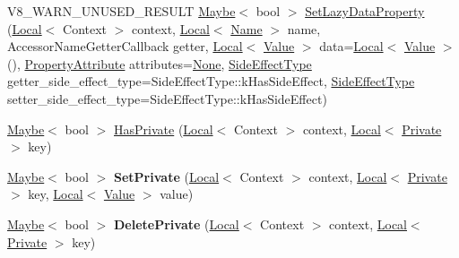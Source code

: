 \begin{DoxyCompactItemize}
V8\+\_\+\+W\+A\+R\+N\+\_\+\+U\+N\+U\+S\+E\+D\+\_\+\+R\+E\+S\+U\+LT \mbox{\hyperlink{classv8_1_1Maybe}{Maybe}}$<$ bool $>$ \mbox{\hyperlink{classv8_1_1Object_a6319997d34104e74b3ce6959affa7095}{Set\+Lazy\+Data\+Property}} (\mbox{\hyperlink{classv8_1_1Local}{Local}}$<$ Context $>$ context, \mbox{\hyperlink{classv8_1_1Local}{Local}}$<$ \mbox{\hyperlink{classv8_1_1Name}{Name}} $>$ name, Accessor\+Name\+Getter\+Callback getter, \mbox{\hyperlink{classv8_1_1Local}{Local}}$<$ \mbox{\hyperlink{classv8_1_1Value}{Value}} $>$ data=\mbox{\hyperlink{classv8_1_1Local}{Local}}$<$ \mbox{\hyperlink{classv8_1_1Value}{Value}} $>$(), \mbox{\hyperlink{namespacev8_a05f25f935e108a1ea2d150e274602b87}{Property\+Attribute}} attributes=\mbox{\hyperlink{namespacev8_a05f25f935e108a1ea2d150e274602b87a7ab4d58719c33b3ea2dfaefa29b111df}{None}}, \mbox{\hyperlink{namespacev8_a29711319c2b9fc7716d65faee2f7b9cb}{Side\+Effect\+Type}} getter\+\_\+side\+\_\+effect\+\_\+type=Side\+Effect\+Type\+::k\+Has\+Side\+Effect, \mbox{\hyperlink{namespacev8_a29711319c2b9fc7716d65faee2f7b9cb}{Side\+Effect\+Type}} setter\+\_\+side\+\_\+effect\+\_\+type=Side\+Effect\+Type\+::k\+Has\+Side\+Effect)
\item 
\mbox{\hyperlink{classv8_1_1Maybe}{Maybe}}$<$ bool $>$ \mbox{\hyperlink{classv8_1_1Object_aad699867935fd2142ec97afa6e39a7f0}{Has\+Private}} (\mbox{\hyperlink{classv8_1_1Local}{Local}}$<$ Context $>$ context, \mbox{\hyperlink{classv8_1_1Local}{Local}}$<$ \mbox{\hyperlink{classv8_1_1Private}{Private}} $>$ key)
\item 
\mbox{\label{classv8_1_1Object_a6ebc49302a65e706c52eeca31ba83283}} 
\mbox{\hyperlink{classv8_1_1Maybe}{Maybe}}$<$ bool $>$ {\bfseries Set\+Private} (\mbox{\hyperlink{classv8_1_1Local}{Local}}$<$ Context $>$ context, \mbox{\hyperlink{classv8_1_1Local}{Local}}$<$ \mbox{\hyperlink{classv8_1_1Private}{Private}} $>$ key, \mbox{\hyperlink{classv8_1_1Local}{Local}}$<$ \mbox{\hyperlink{classv8_1_1Value}{Value}} $>$ value)
\item 
\mbox{\label{classv8_1_1Object_ad78ba140348f92581361329aab917382}} 
\mbox{\hyperlink{classv8_1_1Maybe}{Maybe}}$<$ bool $>$ {\bfseries Delete\+Private} (\mbox{\hyperlink{classv8_1_1Local}{Local}}$<$ Context $>$ context, \mbox{\hyperlink{classv8_1_1Local}{Local}}$<$ \mbox{\hyperlink{classv8_1_1Private}{Private}} $>$ key)
\item 
\mbox{\label{classv8_1_1Object_a6b2e55f1bf6b057c5cd9f2fc0e609c86}} 

\end{DoxyCompactItemize}
